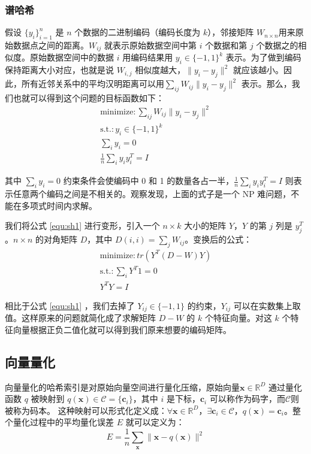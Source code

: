 \subsubsection{谱哈希}
假设 $\{y_i\}^n_{i=1}$ 是 $n$ 个数据的二进制编码（编码长度为 $k$），邻接矩阵 $W_{n\times n}$用来原始数据点之间的距离。$W_{ij}$ 就表示原始数据空间中第 $i$ 个数据和第 $j$ 个数据之的相似度。原始数据空间中的数据 $i$ 用编码结果用 $y_i \in \{-1,1\}^k$ 表示。为了做到编码保持距离大小对应，也就是说 $W_{i,j}$ 相似度越大，$\lVert y_i - y_j \rVert ^2$ 就应该越小。因此，所有近邻关系中的平均汉明距离可以用$\sum_{ij}W_{ij}\lVert y_i - y_j \rVert ^2$ 表示。那么，我们也就可以得到这个问题的目标函数如下：
\begin{equation}
\label{equ:sh1}
\begin{split}
\mathrm{minimize}: \sum_{ij}W_{ij}\lVert y_i - y_j \rVert ^2 \\
\mathrm{s.t.}: y_i \in \{-1,1\}^k \\
\sum_{i} y_i = 0 \\
\frac{1}{n}\sum_{i}y_iy_i^T = I
\end{split}
\end{equation}

其中 $\sum_{i} y_i = 0$ 约束条件会使编码中 0 和 1 的数量各占一半，$\frac{1}{n}\sum_{i}y_iy_i^T = I $ 则表示任意两个编码之间是不相关的。观察发现，上面的式子是一个 NP 难问题，不能在多项式时间内求解。

我们将公式 \ref{equ:sh1} 进行变形，引入一个 $n\times k$ 大小的矩阵 $Y$，$Y$ 的第 $j$ 列是 $y_j^T$ 。$n\times n$ 的对角矩阵 $D$，其中 $D(i,i)=\sum_{j}W_{ij}$。变换后的公式：
\begin{equation}
\label{equ:sh2}
\begin{split}
\mathrm{minimize}: tr(Y^T(D-W)Y)\\
\mathrm{s.t.}: \sum_{i} Y^T1= 0 \\
Y^TY = I
\end{split}
\end{equation}

相比于公式  \ref{equ:sh1} ，我们去掉了 $Y_{ij}\in \{-1,1\}$ 的约束，$Y_{ij}$ 可以在实数集上取值。这样原来的问题就简化成了求解矩阵 $D-W$ 的 $k$ 个特征向量。对这 $k$ 个特征向量根据正负二值化就可以得到我们原来想要的编码矩阵。
\subsection{向量量化}
向量量化的哈希索引是对原始向量空间进行量化压缩，原始向量$\mathbf{x} \in \mathbb{R}^D$ 通过量化函数 $q$ 被映射到 $q(\mathbf{x}) \in \mathcal{C} = \{\mathbf{c}_i\}$，其中 $i$ 是下标，$\mathbf{c}_i$ 可以称作为码字，而$\mathcal{C}$则被称为码本。 这种映射可以形式化定义成：$\forall \mathbf{x} \in \mathbb{R}^D$，$\exists \mathbf{c}_i \in \mathcal{C} $，$q(\mathbf{x})=\mathbf{c}_i$。整个量化过程中的平均量化误差 $E$ 就可以定义为：
\begin{equation}
E = \frac{1}{n}\sum_{\mathbf{x}}\lVert \mathbf{x} - q(\mathbf{x}) \rVert ^2
\end{equation}

